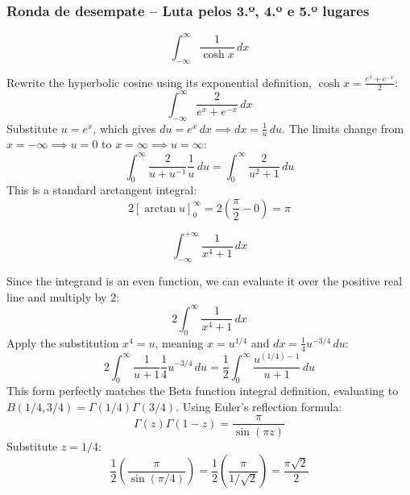 \subsubsection*{Ronda de desempate -- Luta pelos 3.º, 4.º e 5.º lugares}
\begin{questions}
    \question \[ \int_{-\infty}^{\infty} \frac{1}{\cosh x} \,dx \]
    \begin{solution}
        Rewrite the hyperbolic cosine using its exponential definition, $\cosh x = \frac{e^x + e^{-x}}{2}$:
        \[ \int_{-\infty}^{\infty} \frac{2}{e^x + e^{-x}} \,dx \]
        Substitute $u = e^x$, which gives $du = e^x \,dx \implies dx = \frac{1}{u} \,du$. The limits change from $x = -\infty \implies u = 0$ to $x = \infty \implies u = \infty$:
        \[ \int_0^\infty \frac{2}{u + u^{-1}} \frac{1}{u} \,du = \int_0^\infty \frac{2}{u^2 + 1} \,du \]
        This is a standard arctangent integral:
        \[ 2 \left[ \arctan u \right]_0^\infty = 2 \left( \frac{\pi}{2} - 0 \right) = \pi \]
    \end{solution}

    \question \[ \int_{-\infty}^{+\infty} \frac{1}{x^4 + 1} \,dx \]
    \begin{solution}
        Since the integrand is an even function, we can evaluate it over the positive real line and multiply by 2:
        \[ 2 \int_0^\infty \frac{1}{x^4 + 1} \,dx \]
        Apply the substitution $x^4 = u$, meaning $x = u^{1/4}$ and $dx = \frac{1}{4}u^{-3/4} \,du$:
        \[ 2 \int_0^\infty \frac{1}{u + 1} \frac{1}{4} u^{-3/4} \,du = \frac{1}{2} \int_0^\infty \frac{u^{(1/4) - 1}}{u + 1} \,du \]
        This form perfectly matches the Beta function integral definition, evaluating to $B(1/4, 3/4) = \Gamma(1/4)\Gamma(3/4)$. Using Euler's reflection formula:
        \[ \Gamma(z)\Gamma(1-z) = \frac{\pi}{\sin(\pi z)} \]
        Substitute $z = 1/4$:
        \[ \frac{1}{2} \left( \frac{\pi}{\sin(\pi/4)} \right) = \frac{1}{2} \left( \frac{\pi}{1/\sqrt{2}} \right) = \frac{\pi\sqrt{2}}{2} \]
    \end{solution}
\end{questions}

